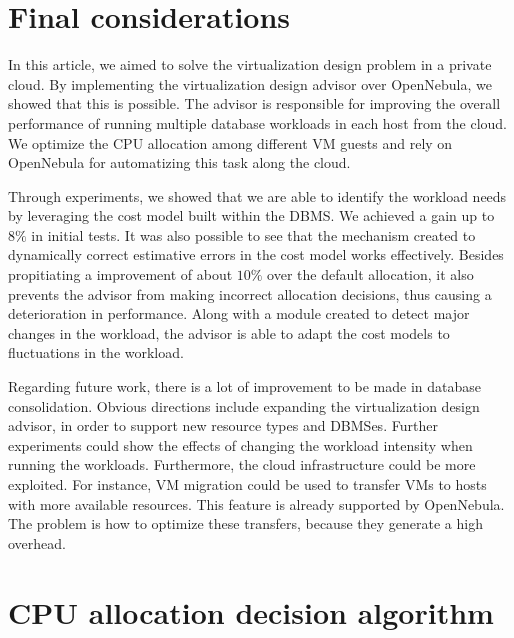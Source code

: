 \documentclass[jidm,a4paper]{jidm} %
\begin{document}
\section{Final considerations}
\label{chap:final}

In this article, we aimed to solve the virtualization design problem in a private cloud. By implementing the virtualization design advisor over OpenNebula, we showed that this is possible. The advisor is responsible for improving the overall performance of running multiple database workloads in each host from the cloud. We optimize the CPU allocation among different VM guests and rely on OpenNebula for automatizing this task along the cloud.

Through experiments, we showed that we are able to identify the workload needs by leveraging the cost model built within the DBMS. We achieved a gain up to $8\%$ in initial tests. It was also possible to see that the mechanism created to dynamically correct estimative errors in the cost model works effectively. Besides propitiating a improvement of about $10\%$ over the default allocation, it also prevents the advisor from making incorrect allocation decisions, thus causing a deterioration in performance. Along with a module created to detect major changes in the workload, the advisor is able to adapt the cost models to fluctuations in the workload.


Regarding future work, there is a lot of improvement to be made in database consolidation. Obvious directions include expanding the virtualization design advisor, in order to support new resource types and DBMSes. Further experiments could show the effects of changing the workload intensity when running the workloads. Furthermore, the cloud infrastructure could be more exploited. For instance, VM migration could be used to transfer VMs to hosts with more available resources.  This feature is already supported by OpenNebula. The problem is how to optimize these transfers, because they generate a high overhead. 


\appendix


\section{CPU allocation decision algorithm}
\label{sec:cpusearch}
\end{document}
